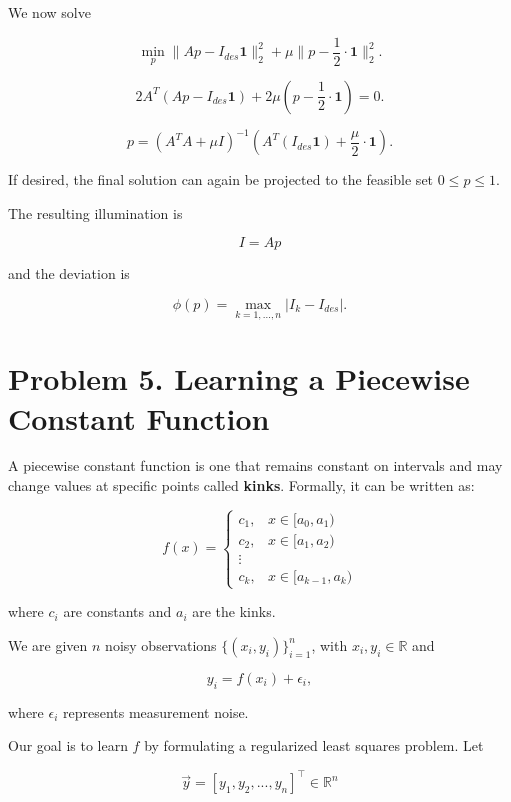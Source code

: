 \documentclass[
	12pt,
]{fphw}
\begin{document}
We now solve

\[
\min_p \|Ap - I_{des}\mathbf{1}\|_2^2 + \mu\|p - \dfrac{1}{2}\cdot \mathbf{1}\|_2^2 .
\]

\[
2A^T(Ap - I_{des}\mathbf{1}) + 2\mu(p - \dfrac{1}{2} \cdot \mathbf{1}) = 0.
\]

\[
p =
(A^TA + \mu I)^{-1}
\left(A^T(I_{des}\mathbf{1}) + \frac{\mu}{2} \cdot  \mathbf{1}\right).
\]

If desired, the final solution can again be projected to the feasible set
$0 \le p \le 1$.

The resulting illumination is

\[
I = Ap
\]

and the deviation is

\[
\phi(p) = \max_{k=1,\ldots,n} |I_k - I_{des}|.
\]






\section*{Problem 5. Learning a Piecewise Constant Function}

A piecewise constant function is one that remains constant on intervals and may change values at specific points called \textbf{kinks}. 
Formally, it can be written as:

\[
f(x) =
\begin{cases}
c_1, & x \in [a_0, a_1) \\
c_2, & x \in [a_1, a_2) \\
\vdots \\
c_k, & x \in [a_{k-1}, a_k)
\end{cases}
\]

where \(c_i\) are constants and \(a_i\) are the kinks.

We are given \(n\) noisy observations \(\{(x_i, y_i)\}_{i=1}^n\), with \(x_i, y_i \in \mathbb{R}\) and

\[
y_i = f(x_i) + \epsilon_i,
\]

where \(\epsilon_i\) represents measurement noise.

Our goal is to learn \(f\) by formulating a regularized least squares problem. Let

\[
\vec{y} = [y_1, y_2, ..., y_n]^\top \in \mathbb{R}^n
\]
\end{document}
